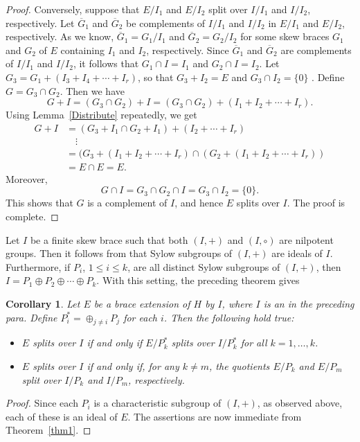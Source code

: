 \documentclass[11pt]{amsart}
\theoremstyle{thrm}
\theoremstyle{plain}
\newtheorem{cor}[thm]{Corollary}
\theoremstyle{definition}
\numberwithin{equation}{section}
\begin{document}
\begin{proof}
Conversely, suppose that \( E/I_1 \) and \( E/I_2 \) split over \( I/I_1 \) and \( I/I_2 \), respectively. Let \( \overline{G}_1 \) and \( \overline{G}_2 \) be complements of \( I/I_1 \) and \( I/I_2 \) in \( E/I_1 \) and \( E/I_2 \), respectively. As we know, \( \overline{G}_1 = G_1/I_1 \) and \( \overline{G}_2 = G_2/I_2 \) for some skew braces \( G_1 \) and \( G_2 \) of \( E \) containing \( I_1 \) and \( I_2 \), respectively. Since \( \overline{G}_1 \) and \( \overline{G}_2 \) are complements of \( I/I_1 \) and \( I/I_2 \), it follows that \( G_1 \cap I = I_1 \) and \( G_2 \cap I = I_2 \). Let \( G_3 = G_1 + (I_3 + I_4 + \cdots + I_r) \), so that \( G_3 + I_2 = E \) and $G_3 \cap I_2=\{0\}$ . Define \( G = G_3 \cap G_2 \). Then we have
\[
G + I = (G_3 \cap G_2) + I = (G_3 \cap G_2) + (I_1 + I_2 + \cdots + I_r).
\]
Using Lemma~\ref{Distribute} repeatedly, we get
\begin{align*}
G + I & = (G_3 + I_1 \cap G_2 + I_1) + (I_2 + \cdots + I_r) \\
&\quad  \vdots\\
&=  (G_3 + (I_1 + I_2 +\cdots +I_r) \cap  (G_2 + (I_1 + I_2 + \cdots  + I_r))\\
& = E \cap E = E.
\end{align*}
Moreover,
\[
G \cap I = G_3 \cap G_2 \cap I = G_3 \cap I_2 = \{0\}.
\]
This shows that \( G \) is a complement of \( I \), and hence \( E \)  splits  over \( I \). The proof is complete.
\end{proof}

Let $I$ be a finite skew brace such that both $(I, +)$ and $(I, \circ)$ are nilpotent groups. Then it follows from \cite[Corollary 4.3]{CSV18} that Sylow subgroups of  $(I, +)$ are ideals of $I$. Furthermore, if $P_i$, $1 \le i \le k$, are all distinct Sylow subgroups of $(I, +)$, then $I = P_1 \oplus P_2 \oplus \cdots \oplus P_k$. With this setting, the preceding  theorem gives
\begin{cor}
Let \( E \) be a brace extension of \( H \) by \( I \), where $I$ is an in the preceding para.   Define \( P_i^* = \oplus_{j \neq i} P_j \) for each \( i \). Then the following hold true:
	\begin{itemize}
		\item[(i)] \( E \) splits over \( I \) if and only if \( E / P_k^* \) splits over \( I / P_k^* \) for all \( k = 1, \ldots, k \).
		\item[(ii)] \( E \) splits over \( I \) if and only if, for any \( k \neq m \), the quotients \( E / P_k \) and \( E / P_m \) split over \( I / P_k \) and \( I / P_m \), respectively.
	\end{itemize}
\end{cor}
\begin{proof}
Since each \( P_i \) is a characteristic subgroup of \( (I, +) \), as observed above,  each of these is an ideal of  \( E \). The assertions are now  immediate from Theorem~\ref{thm1}.
\end{proof}
\end{document}
